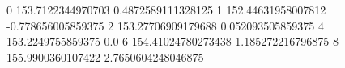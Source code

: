 0 153.7122344970703 0.4872589111328125
1 152.44631958007812 -0.778656005859375
2 153.27706909179688 0.052093505859375
4 153.2249755859375 0.0
6 154.41024780273438 1.185272216796875
8 155.9900360107422 2.7650604248046875
